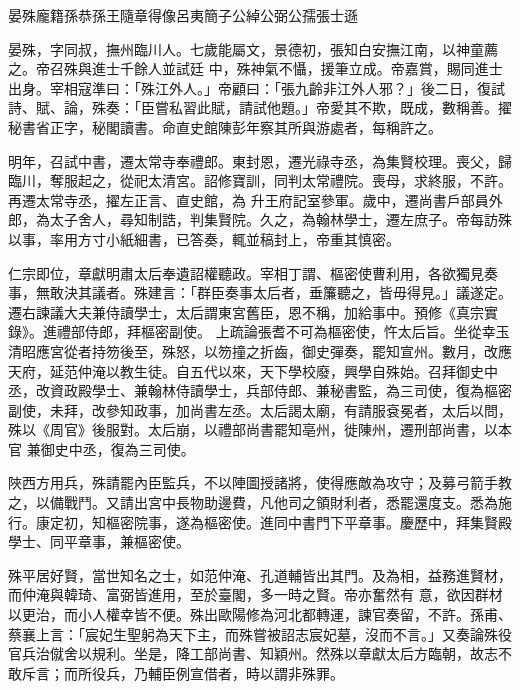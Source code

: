 
\begin{pinyinscope}

 晏殊龐籍孫恭孫王隨章得像呂夷簡子公綽公弼公孺張士遜



 晏殊，字同叔，撫州臨川人。七歲能屬文，景德初，張知白安撫江南，以神童薦之。帝召殊與進士千餘人並試廷
 中，殊神氣不懾，援筆立成。帝嘉賞，賜同進士出身。宰相寇準曰：「殊江外人。」帝顧曰：「張九齡非江外人邪？」後二日，復試詩、賦、論，殊奏：「臣嘗私習此賦，請試他題。」帝愛其不欺，既成，數稱善。擢秘書省正字，秘閣讀書。命直史館陳彭年察其所與游處者，每稱許之。



 明年，召試中書，遷太常寺奉禮郎。東封恩，遷光祿寺丞，為集賢校理。喪父，歸臨川，奪服起之，從祀太清宮。詔修寶訓，同判太常禮院。喪母，求終服，不許。再遷太常寺丞，擢左正言、直史館，為
 升王府記室參軍。歲中，遷尚書戶部員外郎，為太子舍人，尋知制誥，判集賢院。久之，為翰林學士，遷左庶子。帝每訪殊以事，率用方寸小紙細書，已答奏，輒並稿封上，帝重其慎密。



 仁宗即位，章獻明肅太后奉遺詔權聽政。宰相丁謂、樞密使曹利用，各欲獨見奏事，無敢決其議者。殊建言：「群臣奏事太后者，垂簾聽之，皆毋得見。」議遂定。遷右諫議大夫兼侍讀學士，太后謂東宮舊臣，恩不稱，加給事中。預修《真宗實錄》。進禮部侍郎，拜樞密副使。
 上疏論張耆不可為樞密使，忤太后旨。坐從幸玉清昭應宮從者持笏後至，殊怒，以笏撞之折齒，御史彈奏，罷知宣州。數月，改應天府，延范仲淹以教生徒。自五代以來，天下學校廢，興學自殊始。召拜御史中丞，改資政殿學士、兼翰林侍讀學士，兵部侍郎、兼秘書監，為三司使，復為樞密副使，未拜，改參知政事，加尚書左丞。太后謁太廟，有請服袞冕者，太后以問，殊以《周官》後服對。太后崩，以禮部尚書罷知亳州，徙陳州，遷刑部尚書，以本官
 兼御史中丞，復為三司使。



 陜西方用兵，殊請罷內臣監兵，不以陣圖授諸將，使得應敵為攻守；及募弓箭手教之，以備戰鬥。又請出宮中長物助邊費，凡他司之領財利者，悉罷還度支。悉為施行。康定初，知樞密院事，遂為樞密使。進同中書門下平章事。慶歷中，拜集賢殿學士、同平章事，兼樞密使。



 殊平居好賢，當世知名之士，如范仲淹、孔道輔皆出其門。及為相，益務進賢材，而仲淹與韓琦、富弼皆進用，至於臺閣，多一時之賢。帝亦奮然有
 意，欲因群材以更治，而小人權幸皆不便。殊出歐陽修為河北都轉運，諫官奏留，不許。孫甫、蔡襄上言：「宸妃生聖躬為天下主，而殊嘗被詔志宸妃墓，沒而不言。」又奏論殊役官兵治僦舍以規利。坐是，降工部尚書、知穎州。然殊以章獻太后方臨朝，故志不敢斥言；而所役兵，乃輔臣例宣借者，時以謂非殊罪。




\end{pinyinscope}
